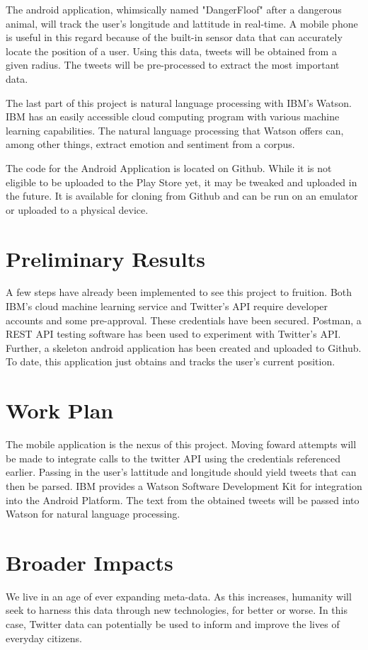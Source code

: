 \documentclass[12pt, oneside]{article}
\begin{document}
The android application, whimsically named "DangerFloof" after a dangerous animal, will track the user's longitude and lattitude in real-time. A mobile phone is useful in this regard because of the built-in sensor data that can accurately locate the position of a user. Using this data, tweets will be obtained from a given radius. The tweets will be pre-processed to extract the most important data.

The last part of this project is natural language processing with IBM's Watson.
IBM has an easily accessible cloud computing program with various machine learning capabilities\cite{IBM}. The natural language processing that Watson offers can, among other things, extract emotion and sentiment from a corpus.

The code for the Android Application is located on Github. While it is not
eligible to be uploaded to the Play Store yet, it may be tweaked and uploaded
in the future\cite{Git}. It is available for cloning from Github and can be run on an emulator or uploaded to a physical device.

\section{Preliminary Results}
A few steps have already been implemented to see this project to fruition. Both
IBM's cloud machine learning service and Twitter's API require developer
accounts and some pre-approval. These credentials have been secured.
Postman, a REST API testing software has been used to experiment with Twitter's
API\cite{Postman}.
Further, a skeleton android application has been created and uploaded to Github. To date, this application just obtains and tracks the user's current position.

\section{Work Plan}
The mobile application is the nexus of this project. Moving foward attempts will be made to integrate calls to the twitter API using the credentials referenced earlier. Passing in the user's lattitude and longitude should yield tweets that can then be parsed. IBM provides a Watson Software Development Kit for integration into the Android Platform. The text from the obtained tweets will be passed into Watson for natural language processing.


\section{Broader Impacts}
We live in an age of ever expanding meta-data. As this increases, humanity will seek to harness this data through new technologies, for better or worse. In this case, Twitter data can potentially be used to inform and improve the lives of everyday citizens.


%

\end{document}
